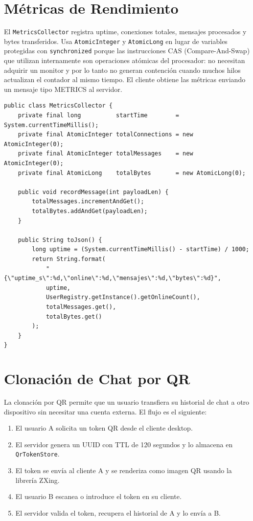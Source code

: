 \documentclass[12pt,a4paper]{article}
\begin{document}
\section{Métricas de Rendimiento}

El \texttt{MetricsCollector} registra uptime, conexiones totales, mensajes
procesados y bytes transferidos. Usa \texttt{AtomicInteger} y \texttt{AtomicLong}
en lugar de variables protegidas con \texttt{synchronized} porque las
instrucciones CAS (Compare-And-Swap) que utilizan internamente son operaciones
atómicas del procesador: no necesitan adquirir un monitor y por lo tanto no
generan contención cuando muchos hilos actualizan el contador al mismo tiempo.
El cliente obtiene las métricas enviando un mensaje tipo METRICS al servidor.

\begin{lstlisting}[style=java, caption={MetricsCollector.java --- contadores lock-free}]
public class MetricsCollector {
    private final long          startTime        = System.currentTimeMillis();
    private final AtomicInteger totalConnections = new AtomicInteger(0);
    private final AtomicInteger totalMessages    = new AtomicInteger(0);
    private final AtomicLong    totalBytes       = new AtomicLong(0);

    public void recordMessage(int payloadLen) {
        totalMessages.incrementAndGet();
        totalBytes.addAndGet(payloadLen);
    }

    public String toJson() {
        long uptime = (System.currentTimeMillis() - startTime) / 1000;
        return String.format(
            "{\"uptime_s\":%d,\"online\":%d,\"mensajes\":%d,\"bytes\":%d}",
            uptime,
            UserRegistry.getInstance().getOnlineCount(),
            totalMessages.get(),
            totalBytes.get()
        );
    }
}
\end{lstlisting}

\section{Clonación de Chat por QR}

La clonación por QR permite que un usuario transfiera su historial de chat
a otro dispositivo sin necesitar una cuenta externa. El flujo es el siguiente:

\begin{enumerate}
  \item El usuario A solicita un token QR desde el cliente desktop.
  \item El servidor genera un UUID con TTL de 120 segundos y lo almacena
    en \texttt{QrTokenStore}.
  \item El token se envía al cliente A y se renderiza como imagen QR usando
    la librería ZXing.
  \item El usuario B escanea o introduce el token en su cliente.
  \item El servidor valida el token, recupera el historial de A y lo envía a B.
\end{enumerate}
\end{document}
